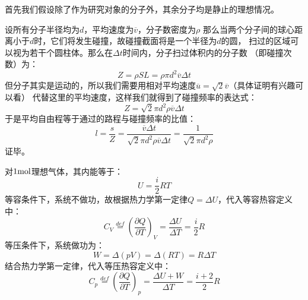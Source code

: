         \begin{prove}
            首先我们假设除了作为研究对象的分子外，其余分子均是静止的理想情况。
            
            设所有分子半径均为$d$，平均速度为$\overline{v}$，分子数密度为$\rho$
            那么当两个分子间的球心距离小于$d$时，它们将发生碰撞，故碰撞截面将是一个半径为$d$的圆，
            扫过的区域可以视为若干个圆柱体。那么在$\Delta t$时间内，分子扫过体积内的分子数 （即碰撞次数）为：
            \begin{equation}
                Z =\rho SL =\rho \pi d^{2} \overline{v} \Delta t
                \nonumber
            \end{equation}
            但分子其实是运动的，所以我们需要用相对平均速度$\overline{u} = \sqrt{2}\overline{v}$（具体证明有兴趣可以看）
            代替这里的平均速度，这样我们就得到了碰撞频率的表达式：
            \begin{equation}
                Z =\sqrt{2}\pi d^{2} \rho \overline{v} \Delta t
            \end{equation}
            于是平均自由程等于通过的路程与碰撞频率的比值：
            \begin{equation}
                l = \frac{s}{Z} = \frac{\overline{v}\Delta t }{\sqrt{2}\pi d^{2} \rho \overline{v} \Delta t} = \frac{1}{\sqrt{2}\pi d^{2} \rho}
            \end{equation}
            证毕。
        \end{prove}
        \begin{prove}
            对$1\rm{mol}$理想气体，其内能等于：
            \begin{equation}
                U = \frac{i}{2}RT
                \nonumber
            \end{equation}
            等容条件下，系统不做功，故根据热力学第一定律$Q = \Delta U$，代入等容热容定义中：
            \begin{equation}
                C_{V} \overset{def}{=} \left(\frac{\partial{Q}}{\partial{T}}\right)_{V} =\frac{\Delta U}{\Delta T}
                =\frac{i}{2}R
            \end{equation}
            等压条件下，系统做功为：
            \begin{equation}
                W = \Delta (pV) = \Delta (RT) =  R\Delta T
                \nonumber
            \end{equation}
            结合热力学第一定律，代入等压热容定义中：
            \begin{equation}
                C_{p} \overset{def}{=} \left(\frac{\partial{Q}}{\partial{T}}\right)_{p} = \frac{\Delta U + W}{\Delta T} 
                = \frac{i+2}{2}R
            \end{equation}
        \end{prove}

